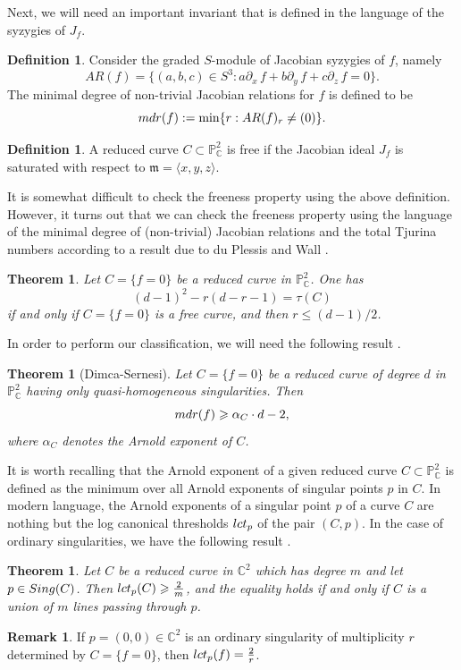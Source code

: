 \documentclass[12pt]{article}
\theoremstyle{plain}
\newtheorem{theorem}[thm]{Theorem}
\theoremstyle{definition}
\newtheorem{definition}[thm]{Definition}
\newtheorem{remark}[thm]{Remark}
\renewcommand\geq{\geqslant}
\renewcommand\leq{\leqslant}
\begin{document}
Next, we will need an important invariant that is defined in the language of the syzygies of $J_{f}$.
\begin{definition}
Consider the graded $S$-module of Jacobian syzygies of $f$, namely $$AR(f)=\{(a,b,c)\in S^3 : a\partial_{x} \, f + b \partial_{y} \, f + c \partial_{z} \, f = 0 \}.$$
The minimal degree of non-trivial Jacobian relations for $f$ is defined to be 
$${\rm mdr}(f):=\min\{r : AR(f)_r\neq (0)\}.$$ 
\end{definition}
\begin{definition}
A reduced curve $C \subset \mathbb{P}^{2}_{\mathbb{C}}$ is free if the Jacobian ideal $J_{f}$ is saturated with respect to $\mathfrak{m} = \langle x,y,z\rangle$.
\end{definition}
It is somewhat difficult to check the freeness property using the above definition. However, it turns out that we can check the freeness property using the language of the minimal degree of (non-trivial) Jacobian relations and the total Tjurina numbers according to a result due to du Plessis and Wall \cite{duP}.
\begin{theorem}
\label{dddp}
Let $C = \{f=0\}$ be a reduced curve in $\mathbb{P}^{2}_{\mathbb{C}}$. One has
\begin{equation}
\label{duPles}
(d-1)^{2} - r(d-r-1) = \tau(C)
\end{equation}
if and only if $C = \{f=0\}$ is a free curve, and then $r \leq (d-1)/2$.
\end{theorem}
In order to perform our classification, we will need the following result \cite[Theorem 2.1]{DimcaSernesi}.
\begin{theorem}[Dimca-Sernesi]
\label{sern}
Let $C = \{f=0\}$ be a reduced curve of degree $d$ in $\mathbb{P}^{2}_{\mathbb{C}}$ having only quasi-homogeneous singularities. Then $${\rm mdr}(f) \geq \alpha_{C}\cdot d - 2,$$
where $\alpha_{C}$ denotes the Arnold exponent of $C$.
\end{theorem}
It is worth recalling that the Arnold exponent of a given reduced curve $C \subset \mathbb{P}^{2}_{\mathbb{C}}$ is defined as the minimum over all Arnold exponents of singular points $p$ in $C$. In modern language, the Arnold exponents of a singular point $p$ of a curve $C$ are nothing but the log canonical thresholds ${\rm lct}_{p}$ of the pair $(C,p)$. In the case of ordinary singularities, we have the following result \cite[Theorem 1.3]{Cheltsov}. 
\begin{theorem}
Let $C$ be a reduced curve in $\mathbb{C}^{2}$ which has degree $m$ and let $p \in {\rm Sing}(C)$. Then ${\rm lct}_{p}(C) \geq \frac{2}{m}$, and the equality holds if and only if $C$ is a union of $m$ lines passing through $p$.
\end{theorem}
\begin{remark}
\label{lct}
If $p=(0,0) \in \mathbb{C}^{2}$ is an ordinary singularity of multiplicity $r$ determined by $C = \{ f=0\}$, then ${\rm lct}_{p}(f) = \frac{2}{r}$.
\end{remark}
\end{document}
